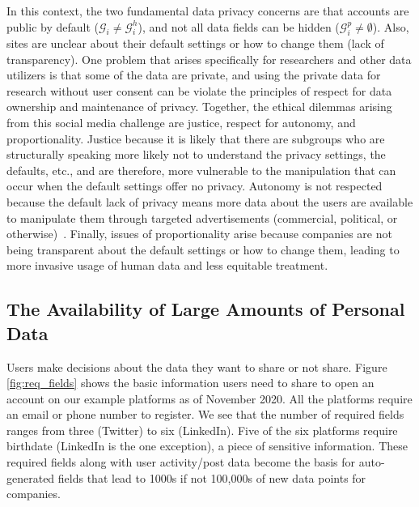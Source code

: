 \documentclass[11pt]{article} %
\begin{document}
In this context, the two fundamental data privacy concerns are that accounts are public by default ($\mathcal{G}_i \neq \mathcal{G}^h_i$), and not all data fields can be hidden ($\mathcal{G}^p_i \neq \emptyset$). Also, sites are unclear about their default settings or how to change them (lack of transparency).
One problem that arises specifically for researchers and other data utilizers is that some of the data are private, and using the private data for research without user consent can be violate the principles of respect for data ownership and maintenance of privacy. Together, the ethical dilemmas arising from this social media challenge are justice, respect for autonomy, and proportionality. Justice because it is likely that there are subgroups who are structurally speaking more likely not to understand the privacy settings, the defaults, etc., and are therefore, more vulnerable to the manipulation that can occur when the default settings offer no privacy. 
Autonomy is not respected because the default lack of privacy means more data about the users are available to manipulate them through targeted advertisements (commercial, political, or otherwise)~\cite{Susser2018}. Finally, issues of proportionality arise because companies are not being transparent about the default settings or how to change them, leading to more invasive usage of human data and less equitable treatment.
 


\subsection{The Availability of Large Amounts of Personal Data}
Users make decisions about the data they want to share or not share. Figure \ref{fig:req_fields} shows the basic information users need to share to open an account on our example platforms as of November 2020. All the platforms require an email or phone number to register. We see that the number of required fields ranges from three (Twitter) to six (LinkedIn). Five of the six platforms require birthdate (LinkedIn is the one exception), a piece of sensitive information. These required fields along with user activity/post data become the basis for auto-generated fields that lead to 1000s if not 100,000s of new data points for companies. 
\end{document}
